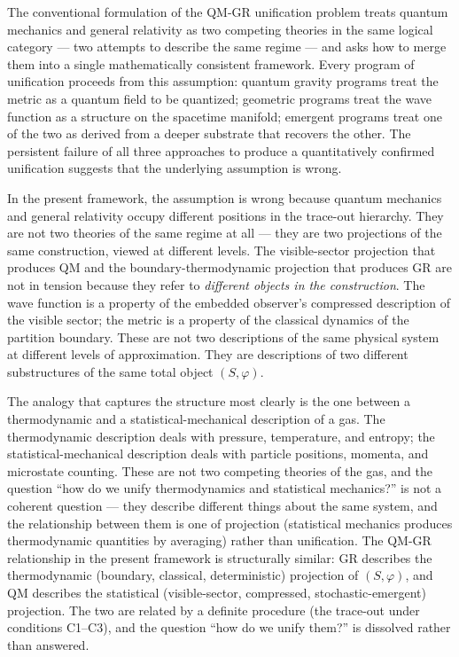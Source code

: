 \documentclass[
]{article}
\begin{document}
The conventional formulation of the QM-GR unification problem treats
quantum mechanics and general relativity as two competing theories in
the same logical category --- two attempts to describe the same regime
--- and asks how to merge them into a single mathematically consistent
framework. Every program of unification proceeds from this assumption:
quantum gravity programs treat the metric as a quantum field to be
quantized; geometric programs treat the wave function as a structure on
the spacetime manifold; emergent programs treat one of the two as
derived from a deeper substrate that recovers the other. The persistent
failure of all three approaches to produce a quantitatively confirmed
unification suggests that the underlying assumption is wrong.

In the present framework, the assumption is wrong because quantum
mechanics and general relativity occupy different positions in the
trace-out hierarchy. They are not two theories of the same regime at all
--- they are two projections of the same construction, viewed at
different levels. The visible-sector projection that produces QM and the
boundary-thermodynamic projection that produces GR are not in tension
because they refer to \emph{different objects in the construction}. The
wave function is a property of the embedded observer's compressed
description of the visible sector; the metric is a property of the
classical dynamics of the partition boundary. These are not two
descriptions of the same physical system at different levels of
approximation. They are descriptions of two different substructures of
the same total object \((S, \varphi)\).

The analogy that captures the structure most clearly is the one between
a thermodynamic and a statistical-mechanical description of a gas. The
thermodynamic description deals with pressure, temperature, and entropy;
the statistical-mechanical description deals with particle positions,
momenta, and microstate counting. These are not two competing theories
of the gas, and the question ``how do we unify thermodynamics and
statistical mechanics?'' is not a coherent question --- they describe
different things about the same system, and the relationship between
them is one of projection (statistical mechanics produces thermodynamic
quantities by averaging) rather than unification. The QM-GR relationship
in the present framework is structurally similar: GR describes the
thermodynamic (boundary, classical, deterministic) projection of
\((S, \varphi)\), and QM describes the statistical (visible-sector,
compressed, stochastic-emergent) projection. The two are related by a
definite procedure (the trace-out under conditions C1--C3), and the
question ``how do we unify them?'' is dissolved rather than answered.
\end{document}
